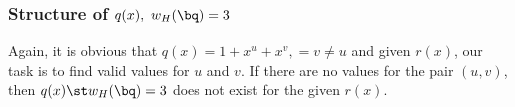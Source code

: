 \newpage




\newpage


\subsubsection{Structure of $q(x),~w_H(\bq) =3$}

Again, it is obvious that $q(x)=1+x^u+x^v,=v\neq u$ and given $r(x)$, our task is to find valid values for $u$ and $v$. If there are no values for the pair $(u,v)$, then $q(x) \st w_H(\bq) =3$ does not exist for the given $r(x)$.
